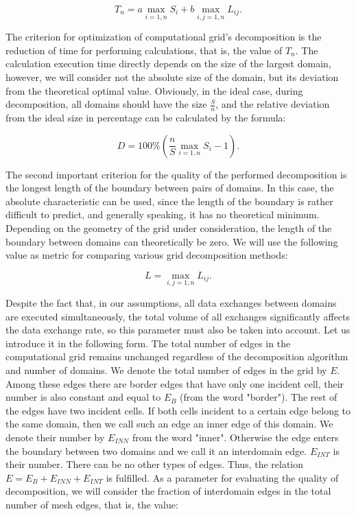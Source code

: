 \documentclass[
11pt,%
tightenlines,%
twoside,%
onecolumn,%
nofloats,%
nobibnotes,%
nofootinbib,%
superscriptaddress,%
noshowpacs,%
centertags]%
{revtex4}
\begin{document}
\begin{equation}
T_n = a \max_{i = 1,n}{S_i} + b \max_{i,j=1,n}{L_{ij}}.
\end{equation}

The criterion for optimization of computational grid's decomposition is the reduction of time for performing calculations, that is, the value of $ T_n $.
The calculation execution time directly depends on the size of the largest domain, however, we will consider not the absolute size of the domain, but its deviation from the theoretical optimal value.
Obviously, in the ideal case, during decomposition, all domains should have the size $ \frac{S}{n} $, and the relative deviation from the ideal size in percentage can be calculated by the formula:

\begin{equation}
D = 100 \% \left( \frac{n}{S} \max_{i=1,n}{S_i} - 1 \right).
\end{equation}

The second important criterion for the quality of the performed decomposition is the longest length of the boundary between pairs of domains.
In this case, the absolute characteristic can be used, since the length of the boundary is rather difficult to predict, and generally speaking, it has no theoretical minimum.
Depending on the geometry of the grid under consideration, the length of the boundary between domains can theoretically be zero.
We will use the following value as metric for comparing various grid decomposition methods:

\begin{equation}
L = \max_{i,j=1,n}{L_{ij}}.
\end{equation}

Despite the fact that, in our assumptions, all data exchanges between domains are executed simultaneously, the total volume of all exchanges significantly affects the data exchange rate, so this parameter must also be taken into account.
Let us introduce it in the following form.
The total number of edges in the computational grid remains unchanged regardless of the decomposition algorithm and number of domains.
We denote the total number of edges in the grid by $ E $.
Among these edges there are border edges that have only one incident cell, their number is also constant and equal to $ E_B $ (from the word "border").
The rest of the edges have two incident cells.
If both cells incident to a certain edge belong to the same domain, then we call such an edge an inner edge of this domain.
We denote their number by $ E_{INN} $ from the word "inner".
Otherwise the edge enters the boundary between two domains and we call it an interdomain edge.
$ E_{INT} $ is their number.
There can be no other types of edges.
Thus, the relation $ E = E_B + E_{INN} + E_{INT} $ is fulfilled.
As a parameter for evaluating the quality of decomposition, we will consider the fraction of interdomain edges in the total number of mesh edges, that is, the value:
\end{document}
